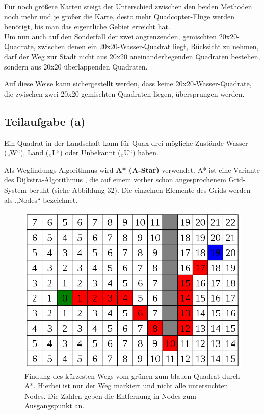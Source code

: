 \documentclass[a4paper,12pt]{article}
\begin{document}
Für noch größere Karten steigt der Unterschied zwischen den beiden Methoden noch mehr und je größer die Karte, desto mehr Quadcopter-Flüge werden benötigt, bis man das eigentliche Gebiet erreicht hat.
\\[0.4cm]
Um nun auch auf den Sonderfall der zwei angrenzenden, gemischten 20x20-Quadrate, zwischen denen ein 20x20-Wasser-Quadrat liegt, Rücksicht zu nehmen, darf der Weg zur Stadt nicht aus 20x20 aneinanderliegenden Quadraten bestehen, sondern aus 20x20 überlappenden Quadraten.

Auf diese Weise kann sichergestellt werden, dass keine 20x20-Wasser-Quadrate, die zwischen zwei 20x20 gemischten Quadraten liegen, übersprungen werden.

\subsection{Teilaufgabe (a)}
Ein Quadrat in der Landschaft kann für Quax drei mögliche Zustände Wasser („W“), Land („L“) oder Unbekannt („U“) haben.

Als Wegfindungs-Algorithmus wird \textbf{A* (A-Star)} \cite{astar} verwendet. A* ist eine Variante des Dijkstra-Algorithmus \cite{taschenbuch_der_algorithmen}, die auf einem vorher schon angesprochenem Grid-System beruht (siehe Abbildung 32). Die einzelnen Elemente des Grids werden als „Nodes“ bezeichnet.
\begin{figure}[H]
\centering
    \includegraphics[width=.8\linewidth]{Bilder/Aufgabe3/AStar_01.png}
    \caption{Findung des kürzesten Wegs vom grünen zum blauen Quadrat durch A*. Hierbei ist nur der Weg markiert und nicht alle untersuchten Nodes. Die Zahlen geben die Entfernung in Nodes zum Ausgangspunkt an.}
\end{figure}
\end{document}
